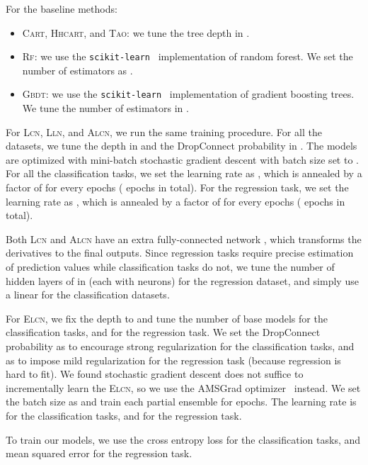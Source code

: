 \documentclass{article} \usepackage{iclr2020_conference,times}
\begin{document}
For the baseline methods:
\begin{itemize}[leftmargin=4mm]
\vspace{-1mm}
    \item \textsc{Cart}, \textsc{Hhcart}, and \textsc{Tao}: we tune the tree depth in .
\vspace{-1mm}
    \item \textsc{Rf}: we use the \texttt{scikit-learn}~\citep{pedregosa2011scikit} implementation of random forest. We set the number of estimators as .
\vspace{-1mm}
    \item \textsc{Gbdt}: we use the \texttt{scikit-learn}~\citep{pedregosa2011scikit} implementation of gradient boosting trees. We tune the number of estimators in .
\vspace{-1mm}
\end{itemize}
For \textsc{Lcn}, \textsc{Lln}, and \textsc{Alcn}, we run the same training procedure. For all the datasets, we tune the depth in  and the DropConnect probability in . 
The models are optimized with mini-batch stochastic gradient descent with batch size set to . For all the classification tasks, we set the learning rate as , which is annealed by a factor of  for every  epochs ( epochs in total). For the regression task, we set the learning rate as , which is annealed by a factor of  for every  epochs ( epochs in total).

Both \textsc{Lcn} and \textsc{Alcn} have an extra fully-connected network , which transforms the derivatives  to the final outputs. Since regression tasks require precise estimation of prediction values while classification tasks do not, we tune the number of hidden layers of  in  (each with  neurons) for the regression dataset, and simply use a linear  for the classification datasets. 


For \textsc{Elcn}, we fix the depth to  and tune the number of base models  for the classification tasks, and  for the regression task. 
We set the DropConnect probability as  to encourage strong regularization for the classification tasks, and as  to impose mild regularization for the regression task (because regression is hard to fit).
We found stochastic gradient descent does not suffice to incrementally learn the \textsc{Elcn}, so we use the AMSGrad optimizer~\citep{reddi2019convergence} instead. We set the batch size as  and train each partial ensemble for  epochs. The learning rate is  for the classification tasks, and  for the regression task.

To train our models, we use the cross entropy loss for the classification tasks, and mean squared error for the regression task.
\end{document}
